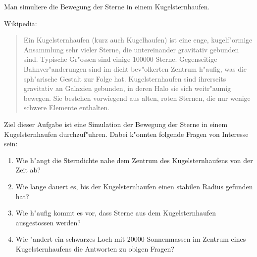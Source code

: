 \begin{aufgabe}
Man simuliere die Bewegung der Sterne in einem Kugelsternhaufen.
\end{aufgabe}

Wikipedia:
\begin{quote}
Ein Kugelsternhaufen (kurz auch Kugelhaufen) ist eine enge,
kugel\-f"ormige Ansammlung sehr vieler Sterne, die untereinander
gravitativ gebunden sind. Typische Gr"ossen sind einige 100000 Sterne.
Gegenseitige Bahnver"anderungen sind im dicht bev"olkerten Zentrum
h"aufig, was die sph"arische Gestalt zur Folge hat. Kugelsternhaufen
sind ihrerseits gravitativ an Galaxien gebunden, in deren Halo sie
sich weitr"aumig bewegen. Sie bestehen vorwiegend aus alten, roten
Sternen, die nur wenige schwere Elemente enthalten.
\end{quote}

Ziel dieser Aufgabe ist eine Simulation der Bewegung der Sterne in
einem Kugelsternhaufen durchzuf"uhren. Dabei k"onnten folgende Fragen
von Interesse sein:
\begin{enumerate}
\item Wie h"angt die Sterndichte nahe dem Zentrum des Kugelsternhaufens
von der Zeit ab?
\item Wie lange dauert es, bis der Kugelsternhaufen einen stabilen
Radius gefunden hat?
\item Wie h"aufig kommt es vor, dass Sterne aus dem Kugelsternhaufen
ausgestossen werden?
\item Wie "andert ein schwarzes Loch mit 20000 Sonnenmassen im Zentrum
eines Kugelsternhaufens die Antworten zu obigen Fragen?
\end{enumerate}
